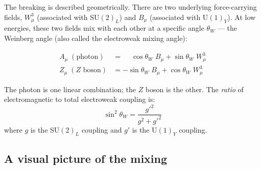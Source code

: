 \documentclass[11pt,a4paper]{article}
\newcommand{\sinwsq}{\sin^2\!\theta_W}
\begin{document}
The breaking is described geometrically.  There are two underlying force-carrying
fields, $W_\mu^3$ (associated with SU$(2)_L$) and $B_\mu$ (associated with
U$(1)_Y$).  At low energies, these two fields mix with each other at a specific
angle $\theta_W$ — the Weinberg angle (also called the electroweak mixing angle):

\begin{align}
  A_\mu \;(\text{photon}) &= \phantom{-}\cos\theta_W\;B_\mu + \sin\theta_W\;W_\mu^3 \\
  Z_\mu \;(\text{$Z$ boson}) &= -\sin\theta_W\;B_\mu + \cos\theta_W\;W_\mu^3
\end{align}

\noindent
The photon is one linear combination; the $Z$ boson is the other.
The \emph{ratio} of electromagnetic to total electroweak coupling is:
\[
  \sinwsq = \frac{g'^2}{g^2 + g'^2}
\]
where $g$ is the SU$(2)_L$ coupling and $g'$ is the U$(1)_Y$ coupling.

\subsection{A visual picture of the mixing}

\begin{center}
\end{center}
\end{document}
